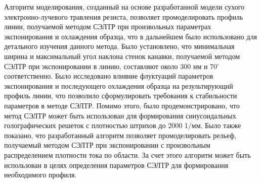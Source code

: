 Алгоритм моделирования, созданный на основе разработанной модели сухого электронно-лучевого травления резиста, позволяет промоделировать профиль линии, получаемой методом СЭЛТР при произвольных параметрах экспонирования и охлаждения образца, что в дальнейшем было использовано для детального изучения данного метода.
Было установлено, что минимальная ширина и максимальный угол наклона стенок канавки, получаемой методом СЭЛТР при экспонировании в линию, составляют около 300 нм и 70$^\circ$ соответственно.
Было исследовано влияние флуктуаций параметров экспонирования и последующего охлаждения образца на результирующий профиль линии, что позволило сформулировать требования к стабильности параметров в методе СЭЛТР. 
Помимо этого, было продемонстрировано, что метод СЭЛТР может быть использован для формирования синусоидальных голографических решеток с плотностью штрихов до 2000 1/мм.
Было также показано, что разработанный алгоритм позволяет промоделировать рельеф, получаемый методом СЭЛТР при экспонировании с произвольным распределением плотности тока по области.
За счет этого алгоритм может быть использован в целях определения параметров СЭЛТР для формирования необходимого профиля.
